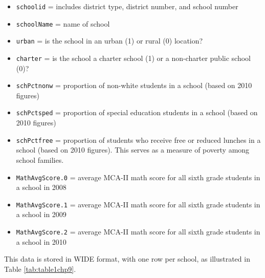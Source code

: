 \documentclass[
]{krantz}
\providecommand{\tightlist}{%
  \setlength{\itemsep}{0pt}\setlength{\parskip}{0pt}}
\begin{document}
\begin{itemize}
\tightlist
\item
  \texttt{schoolid} = includes district type, district number, and school number
\item
  \texttt{schoolName} = name of school
\item
  \texttt{urban} = is the school in an urban (1) or rural (0) location?
\item
  \texttt{charter} = is the school a charter school (1) or a non-charter public school (0)?
\item
  \texttt{schPctnonw} = proportion of non-white students in a school (based on 2010 figures)
\item
  \texttt{schPctsped} = proportion of special education students in a school (based on 2010 figures)
\item
  \texttt{schPctfree} = proportion of students who receive free or reduced lunches in a school (based on 2010 figures). This serves as a measure of poverty among school families.
\item
  \texttt{MathAvgScore.0} = average MCA-II math score for all sixth grade students in a school in 2008
\item
  \texttt{MathAvgScore.1} = average MCA-II math score for all sixth grade students in a school in 2009
\item
  \texttt{MathAvgScore.2} = average MCA-II math score for all sixth grade students in a school in 2010
\end{itemize}

This data is stored in WIDE format, with one row per school, as illustrated in Table \ref{tab:table1chp9}.

\begin{table}

\caption{\label{tab:table1chp9}The first six observations in the wide data set for the Charter Schools case study.}
\centering
{}
\end{table}
\end{document}
